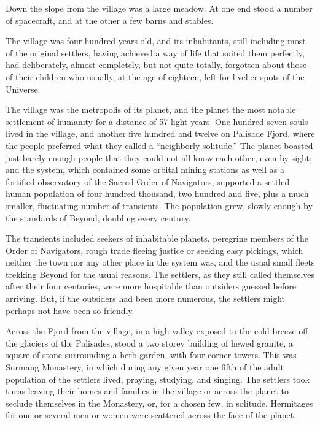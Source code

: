 \documentclass[english,11pt,letterpaper,onecolumn]{scrbook}
\begin{document}
	Down the slope from the village was a large meadow. At one end stood a number of spacecraft, and at the other a few barns and stables.

	The village was four hundred years old, and its inhabitants, still including most of the original settlers, having achieved a way of life that suited them perfectly, had deliberately, almost completely, but not quite totally, forgotten about those of their children who usually, at the age of eighteen, left for livelier spots of the Universe.

	The village was the metropolis of its planet, and the planet the most notable settlement of humanity for a distance of 57 light-years. One hundred seven souls lived in the village, and another five hundred and twelve on Palisade Fjord, where the people preferred what they called a ``neighborly solitude.'' The planet boasted just barely enough people that they could not all know each other, even by sight; and the system, which contained some orbital mining stations as well as a fortified observatory of the Sacred Order of Navigators, supported a settled human population of four hundred thousand, two hundred and five, plus a much smaller, fluctuating number of transients. The population grew, slowly enough by the standards of Beyond, doubling every century.

	The transients included seekers of inhabitable planets, peregrine members of the Order of Navigators, rough trade fleeing justice or seeking easy pickings, which neither the town nor any other place in the system was, and the usual small fleets trekking Beyond for the usual reasons. The settlers, as they still called themselves after their four centuries, were more hospitable than outsiders guessed before arriving.  But, if the outsiders had been more numerous, the settlers might perhaps not have been so friendly.

	Across the Fjord from the village, in a high valley exposed to the cold breeze off the glaciers of the Palisades, stood a two storey building of hewed granite, a square of stone surrounding a herb garden, with four corner towers. This was Surmang Monastery, in which during any given year one fifth of the adult population of the settlers lived, praying, studying, and singing. The settlers took turns leaving their homes and families in the village or across the planet to seclude themselves in the Monastery, or, for a chosen few, in solitude.  Hermitages for one or several men or women were scattered across the face of the planet.
\end{document}
